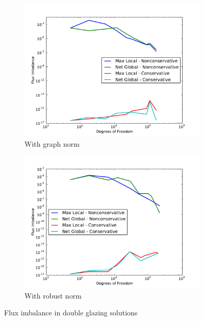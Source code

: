 \documentclass[letterpaper]{article}
\begin{document}
\begin{figure}
\centering
\begin{subfigure}[t]{0.45\textwidth}
\centering
\includegraphics[width=\textwidth]{figs/DoubleGlazing/graphFlux.pdf}
\caption{With graph norm}
\label{fig:doubleglazingGraphFlux}
\end{subfigure}
\begin{subfigure}[t]{0.45\textwidth}
\centering
\includegraphics[width=\textwidth]{figs/DoubleGlazing/robustFlux.pdf}
\caption{With robust norm}
\label{fig:doubleglazingRobustFlux}
\end{subfigure}
\caption{Flux imbalance in double glazing solutions}
\label{fig:doubleglazing_flux}
\end{figure}
\end{document}
